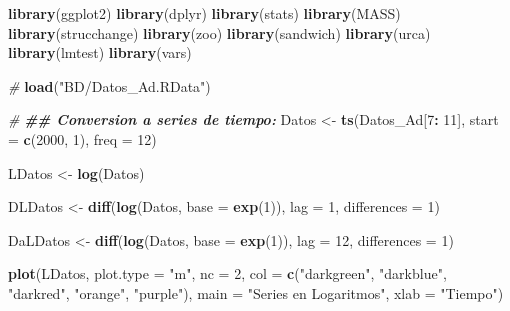 \documentclass[
]{book}
\newenvironment{Shaded}{\begin{snugshade}}{\end{snugshade}}
\newcommand{\AttributeTok}[1]{\textcolor[rgb]{0.13,0.29,0.53}{#1}}
\newcommand{\CommentTok}[1]{\textcolor[rgb]{0.56,0.35,0.01}{\textit{#1}}}
\newcommand{\DecValTok}[1]{\textcolor[rgb]{0.00,0.00,0.81}{#1}}
\newcommand{\DocumentationTok}[1]{\textcolor[rgb]{0.56,0.35,0.01}{\textbf{\textit{#1}}}}
\newcommand{\FunctionTok}[1]{\textcolor[rgb]{0.13,0.29,0.53}{\textbf{#1}}}
\newcommand{\NormalTok}[1]{#1}
\newcommand{\OtherTok}[1]{\textcolor[rgb]{0.56,0.35,0.01}{#1}}
\newcommand{\SpecialCharTok}[1]{\textcolor[rgb]{0.81,0.36,0.00}{\textbf{#1}}}
\newcommand{\StringTok}[1]{\textcolor[rgb]{0.31,0.60,0.02}{#1}}
\begin{document}
\begin{Shaded}
\begin{Highlighting}[]
\FunctionTok{library}\NormalTok{(ggplot2)}
\FunctionTok{library}\NormalTok{(dplyr)}
\FunctionTok{library}\NormalTok{(stats)}
\FunctionTok{library}\NormalTok{(MASS)}
\FunctionTok{library}\NormalTok{(strucchange)}
\FunctionTok{library}\NormalTok{(zoo)}
\FunctionTok{library}\NormalTok{(sandwich)}
\FunctionTok{library}\NormalTok{(urca)}
\FunctionTok{library}\NormalTok{(lmtest)}
\FunctionTok{library}\NormalTok{(vars)}

\CommentTok{\#}
\FunctionTok{load}\NormalTok{(}\StringTok{"BD/Datos\_Ad.RData"}\NormalTok{)}

\CommentTok{\#}
\DocumentationTok{\#\# Conversion a series de tiempo:}
\NormalTok{Datos }\OtherTok{\textless{}{-}} \FunctionTok{ts}\NormalTok{(Datos\_Ad[}\DecValTok{7}\SpecialCharTok{:} \DecValTok{11}\NormalTok{], }
            \AttributeTok{start =} \FunctionTok{c}\NormalTok{(}\DecValTok{2000}\NormalTok{, }\DecValTok{1}\NormalTok{), }
            \AttributeTok{freq =} \DecValTok{12}\NormalTok{)}

\NormalTok{LDatos }\OtherTok{\textless{}{-}} \FunctionTok{log}\NormalTok{(Datos)}

\NormalTok{DLDatos }\OtherTok{\textless{}{-}} \FunctionTok{diff}\NormalTok{(}\FunctionTok{log}\NormalTok{(Datos, }\AttributeTok{base =} \FunctionTok{exp}\NormalTok{(}\DecValTok{1}\NormalTok{)), }
                \AttributeTok{lag =} \DecValTok{1}\NormalTok{, }
                \AttributeTok{differences =} \DecValTok{1}\NormalTok{)}

\NormalTok{DaLDatos }\OtherTok{\textless{}{-}} \FunctionTok{diff}\NormalTok{(}\FunctionTok{log}\NormalTok{(Datos, }\AttributeTok{base =} \FunctionTok{exp}\NormalTok{(}\DecValTok{1}\NormalTok{)), }
                 \AttributeTok{lag =} \DecValTok{12}\NormalTok{, }
                 \AttributeTok{differences =} \DecValTok{1}\NormalTok{)}
\end{Highlighting}
\end{Shaded}

\begin{Shaded}
\begin{Highlighting}[]
\FunctionTok{plot}\NormalTok{(LDatos, }
     \AttributeTok{plot.type =} \StringTok{"m"}\NormalTok{, }\AttributeTok{nc =} \DecValTok{2}\NormalTok{,}
     \AttributeTok{col =} \FunctionTok{c}\NormalTok{(}\StringTok{"darkgreen"}\NormalTok{, }\StringTok{"darkblue"}\NormalTok{, }\StringTok{"darkred"}\NormalTok{, }\StringTok{"orange"}\NormalTok{, }\StringTok{"purple"}\NormalTok{), }
     \AttributeTok{main =} \StringTok{"Series en Logaritmos"}\NormalTok{, }
     \AttributeTok{xlab =} \StringTok{"Tiempo"}\NormalTok{)}
\end{Highlighting}
\end{Shaded}
\end{document}
